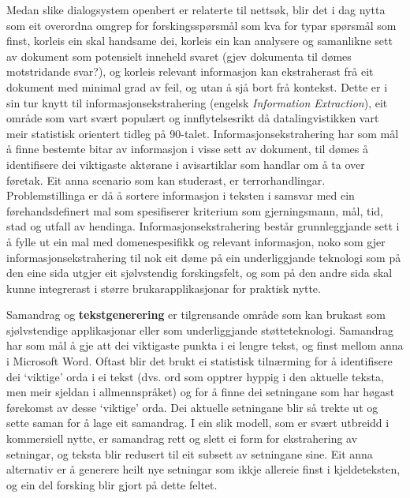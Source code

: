 \begin{multicols}{2}
Medan slike dialogsystem openbert er relaterte til nettsøk, blir det i dag nytta som eit overordna omgrep for forskingsspørsmål som kva for typar spørsmål som finst, korleis ein skal handsame dei, korleis ein kan analysere og samanlikne sett av dokument som potensielt inneheld svaret (gjev dokumenta til dømes motstridande svar?), og korleis relevant informasjon kan ekstraherast frå eit dokument med minimal grad av feil, og utan å sjå bort frå kontekst. Dette er i sin tur knytt til informasjonsekstrahering (engelsk \textit{Information Extraction}), eit område som vart svært populært og innflytelsesrikt då datalingvistikken vart meir statistisk orientert tidleg på 90-talet. Informasjonsekstrahering har som mål å finne bestemte bitar av informasjon i visse sett av dokument, til dømes å identifisere dei viktigaste aktørane i avisartiklar som handlar om å ta over føretak. Eit anna scenario som kan studerast, er terrorhandlingar. Problemstillinga er då å sortere informasjon i teksten i samsvar med ein førehandsdefinert mal som spesifiserer kriterium som gjerningsmann, mål, tid, stad og utfall av hendinga. Informasjonsekstrahering består grunnleggjande sett i å fylle ut ein mal med domenespesifikk og relevant informasjon, noko som gjer informasjonsekstrahering til nok eit døme på ein underliggjande teknologi som på den eine sida utgjer eit sjølvstendig forskingsfelt, og som på den andre sida skal kunne integrerast i større brukarapplikasjonar for praktisk nytte.

Samandrag og \textbf{tekstgenerering} er tilgrensande område som kan brukast som sjølvstendige applikasjonar eller som underliggjande støtteteknologi. Samandrag har som mål å gje att dei viktigaste punkta i ei lengre tekst, og finst mellom anna  i Microsoft Word. Oftast blir det brukt ei statistisk tilnærming for å identifisere dei `viktige' orda i ei tekst (dvs. ord som opptrer hyppig i den aktuelle teksta, men meir sjeldan i allmennspråket) og for å finne dei setningane som har høgast førekomst av desse `viktige' orda. Dei aktuelle setningane blir så trekte ut og sette saman for å lage eit samandrag. I ein slik modell, som er svært utbreidd i kommersiell nytte, er samandrag rett og slett ei form for ekstrahering av setningar, og teksta blir redusert til eit subsett av setningane sine. Eit anna alternativ er å generere heilt nye setningar som ikkje allereie finst i kjeldeteksten, og ein del forsking blir gjort på dette feltet.



\end{multicols}
